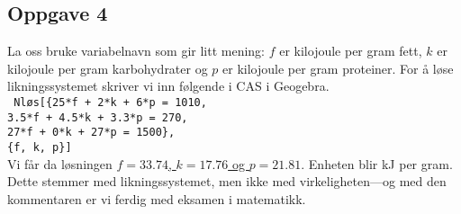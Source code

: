 \documentclass[12pt, a4paper]
{article}						%
\def\answer#1{\underline{\underline{#1}}}
\begin{document}
\subsection*{Oppgave 4}
La oss bruke variabelnavn som gir litt mening: $f$ er kilojoule per gram fett, $k$ er kilojoule per gram karbohydrater og $p$ er kilojoule per gram proteiner. For å løse likningssystemet skriver vi inn følgende i CAS i Geogebra. \\
\texttt{
Nløs[\{25*f + 2*k + 6*p = 1010,\\ 
3.5*f + 4.5*k + 3.3*p = 270, \\
27*f + 0*k + 27*p = 1500\},\\
\{f, k, p\}]} \\
Vi får da løsningen \answer{$f = 33.74$, $k=17.76$ og $p = 21.81$}.
Enheten blir kJ per gram.
Dette stemmer med likningssystemet, men ikke med virkeligheten---og med den kommentaren er vi ferdig med eksamen i matematikk.
	
	
\end{document}
